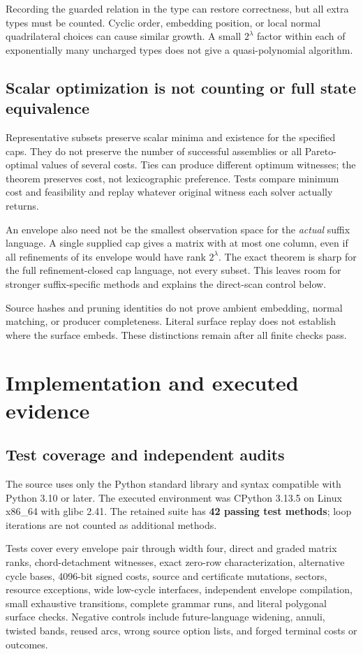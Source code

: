 \documentclass[11pt,a4paper]{article}
\theoremstyle{definition}
\theoremstyle{remark}
\begin{document}
Recording the guarded relation in the type can restore correctness, but all extra types
must be counted. Cyclic order, embedding position, or local normal quadrilateral choices
can cause similar growth. A small $2^\lambda$ factor within each of exponentially many
uncharged types does not give a quasi-polynomial algorithm.

\subsection{Scalar optimization is not counting or full state equivalence}
Representative subsets preserve scalar minima and existence for the specified caps.
They do not preserve the number of successful assemblies or all Pareto-optimal values
of several costs. Ties can produce different optimum witnesses; the theorem preserves
cost, not lexicographic preference. Tests compare minimum cost and feasibility and replay
whatever original witness each solver actually returns.

An envelope also need not be the smallest observation space for the \emph{actual} suffix
language. A single supplied cap gives a matrix with at most one column, even if all
refinements of its envelope would have rank $2^\lambda$. The exact theorem is sharp for
the full refinement-closed cap language, not every subset. This leaves room for stronger
suffix-specific methods and explains the direct-scan control below.

Source hashes and pruning identities do not prove ambient embedding, normal matching,
or producer completeness. Literal surface replay does not establish where the surface
embeds. These distinctions remain after all finite checks pass.

\section{Implementation and executed evidence}\label{sec:experiments}
\subsection{Test coverage and independent audits}
The source uses only the Python standard library and syntax compatible with Python 3.10
or later. The executed environment was CPython 3.13.5 on Linux x86\_64 with glibc 2.41.
The retained suite has \textbf{42 passing test methods}; loop iterations are not counted
as additional methods.

Tests cover every envelope pair through width four, direct and graded matrix ranks,
chord-detachment witnesses, exact zero-row characterization, alternative cycle bases,
4096-bit signed costs, source and certificate mutations, sectors, resource exceptions,
wide low-cycle interfaces, independent envelope compilation, small exhaustive transitions,
complete grammar runs, and literal polygonal surface checks. Negative controls include
future-language widening, annuli, twisted bands, reused arcs, wrong source option lists,
and forged terminal costs or outcomes.
\end{document}
